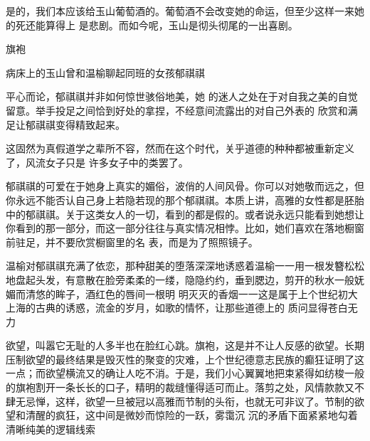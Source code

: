 \documentclass{article}
\begin{document}
是的，我们本应该给玉山葡萄酒的。葡萄酒不会改变她的命运，但至少这样一来她的死还能算得上
是悲剧。而如今呢，玉山是彻头彻尾的一出喜剧。 


旗袍 

病床上的玉山曾和温榆聊起同班的女孩郁祺祺

平心而论，郁祺祺并非如何惊世骇俗地美，她
\newpage
的迷人之处在于对自我之美的自觉留意。举手投足之间恰到好处的拿捏，不经意间流露出的对自己外表的
欣赏和满足让郁祺祺变得精致起来。 

这固然为真假道学之辈所不容，然而在这个时代，关乎道德的种种都被重新定义了，风流女子只是
许多女子中的类罢了。 

郁祺祺的可爱在于她身上真实的媚俗，波俏的人间风骨。你可以对她敬而远之，但你永远不能否认自己身上若隐若现的那个郁祺祺。本质上讲，高雅的女性都是胚胎中的郁祺祺。关于这类女人的一切，看到的都是假的。或者说永远只能看到她想让你看到的那一部分，而这一部分往往与真实情况相悖。比如，她们喜欢在落地橱窗前驻足，并不要欣赏橱窗里的名
表，而是为了照照镜子。 

温榆对郁祺祺充满了依恋，那种甜美的堕落深深地诱惑着温榆一一用一根发簪松松地盘起头发，有意散在脸旁柔柔的一缕，隐隐约约，垂到腮边，剪开的秋水一般妩媚而清悠的眸子，酒红色的唇间一根明
\newpage
明灭灭的香烟一一这是属于上个世纪初大上海的古典的诱惑，流金的岁月，如歌的情怀，让那些道德上的
质问显得苍白无力 

欲望，叫嚣它无耻的人多半也在脸红心跳。旗袍，这是并不让人反感的欲望。长期压制欲望的最终结果是毁灭性的聚变的灾难，上个世纪德意志民族的癫狂证明了这一点；而欲望横流又的确让人吃不消。于是，我们小心翼翼地把束紧得如纺梭一般的旗袍割开一条长长的口子，精明的裁缝懂得适可而止。落剪之处，风情款款又不肆无忌惮，这样，欲望一旦被冠以高雅而节制的头衔，也就无可非议了。节制的欲望和清醒的疯狂，这中间是微妙而惊险的一跃，雾霭沉
沉的矛盾下面紧紧地勾着清晰纯美的逻辑线索 
\end{document}
